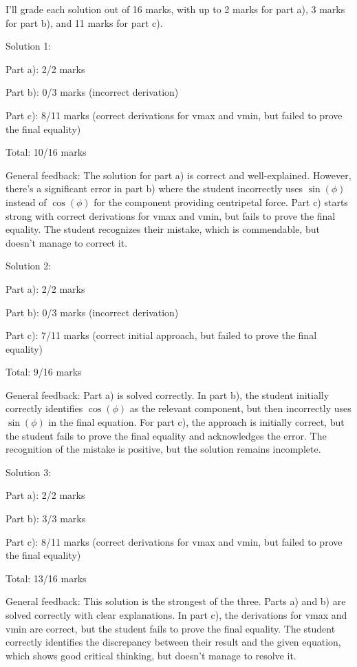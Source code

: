 \documentclass[a4paper,11pt]{article}
\begin{document}
I'll grade each solution out of 16 marks, with up to 2 marks for part a), 3 marks for part b), and 11 marks for part c).

Solution 1:

Part a): 2/2 marks

Part b): 0/3 marks (incorrect derivation)

Part c): 8/11 marks (correct derivations for vmax and vmin, but failed to prove the final equality)

Total: 10/16 marks

General feedback: The solution for part a) is correct and well-explained. However, there's a significant error in part b) where the student incorrectly uses \(\sin(\phi)\) instead of \(\cos(\phi)\) for the component providing centripetal force. Part c) starts strong with correct derivations for vmax and vmin, but fails to prove the final equality. The student recognizes their mistake, which is commendable, but doesn't manage to correct it.

Solution 2:

Part a): 2/2 marks

Part b): 0/3 marks (incorrect derivation)

Part c): 7/11 marks (correct initial approach, but failed to prove the final equality)

Total: 9/16 marks

General feedback: Part a) is solved correctly. In part b), the student initially correctly identifies \(\cos(\phi)\) as the relevant component, but then incorrectly uses \(\sin(\phi)\) in the final equation. For part c), the approach is initially correct, but the student fails to prove the final equality and acknowledges the error. The recognition of the mistake is positive, but the solution remains incomplete.

Solution 3:

Part a): 2/2 marks

Part b): 3/3 marks

Part c): 8/11 marks (correct derivations for vmax and vmin, but failed to prove the final equality)

Total: 13/16 marks

General feedback: This solution is the strongest of the three. Parts a) and b) are solved correctly with clear explanations. In part c), the derivations for vmax and vmin are correct, but the student fails to prove the final equality. The student correctly identifies the discrepancy between their result and the given equation, which shows good critical thinking, but doesn't manage to resolve it.
\end{document}

